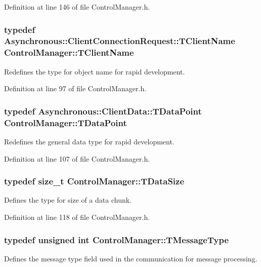 Definition at line 146 of file Control\-Manager.\-h.

\hypertarget{class_control_manager_ae9c86c5286c9ebf222ea44b60c463872}{
\subsubsection[{T\-Client\-Name}]{\setlength{\rightskip}{0pt plus 5cm}typedef {\bf Asynchronous\-::\-Client\-Connection\-Request\-::\-T\-Client\-Name} {\bf Control\-Manager\-::\-T\-Client\-Name}}}\label{class_control_manager_ae9c86c5286c9ebf222ea44b60c463872}
Redefines the type for object name for rapid development. 

Definition at line 97 of file Control\-Manager.\-h.

\hypertarget{class_control_manager_a236ef5279ad4f3082443e4c6d300a7d2}{
\subsubsection[{T\-Data\-Point}]{\setlength{\rightskip}{0pt plus 5cm}typedef {\bf Asynchronous\-::\-Client\-Data\-::\-T\-Data\-Point} {\bf Control\-Manager\-::\-T\-Data\-Point}}}\label{class_control_manager_a236ef5279ad4f3082443e4c6d300a7d2}
Redefines the general data type for rapid development. 

Definition at line 107 of file Control\-Manager.\-h.

\hypertarget{class_control_manager_a5c898e9e00806858a59700370560aea7}{
\subsubsection[{T\-Data\-Size}]{\setlength{\rightskip}{0pt plus 5cm}typedef size\-\_\-t {\bf Control\-Manager\-::\-T\-Data\-Size}\hspace{0.3cm}{\ttfamily [private]}}}\label{class_control_manager_a5c898e9e00806858a59700370560aea7}
Defines the type for size of a data chunk. 

Definition at line 118 of file Control\-Manager.\-h.

\hypertarget{class_control_manager_a36b60e90749624a648dc225c2c136397}{
\subsubsection[{T\-Message\-Type}]{\setlength{\rightskip}{0pt plus 5cm}typedef unsigned int {\bf Control\-Manager\-::\-T\-Message\-Type}\hspace{0.3cm}{\ttfamily [private]}}}\label{class_control_manager_a36b60e90749624a648dc225c2c136397}
Defines the message type field used in the communication for message processing. 

